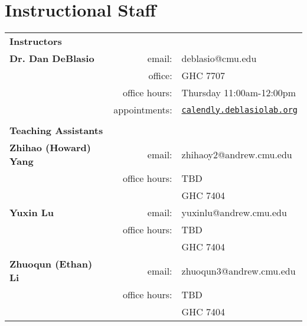 \section{Instructional Staff}

\begin{tabular}{lrl}
\multicolumn{3}{l}{\Large \textbf{Instructors}}\vspace{0.75em}\\
\textbf{Dr. Dan DeBlasio}  
 & email: & deblasio@cmu.edu\\
 & office: & GHC 7707\\
& office hours:& Thursday 11:00am-12:00pm \\
& appointments: & \href{http://calendly.deblasiolab.org}{\texttt{calendly.deblasiolab.org}} \vspace{0.5em}\\

\\
\multicolumn{3}{l}{\Large \textbf{Teaching Assistants}}\vspace{0.75em}\\
%
\textbf{Zhihao (Howard) Yang}
 & email: & zhihaoy2@andrew.cmu.edu\\
 & office hours:& TBD\\
 && GHC 7404 \vspace{0.5em}\\

\textbf{Yuxin Lu}
 & email: & yuxinlu@andrew.cmu.edu\\
 & office hours:& TBD\\
 && GHC 7404\\

\textbf{Zhuoqun (Ethan) Li}
 & email: & zhuoqun3@andrew.cmu.edu\\
 & office hours:& TBD\\
 && GHC 7404\\



\end{tabular}